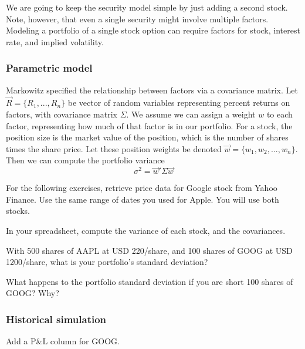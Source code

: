 \documentclass{report}
\numberwithin{problem}{chapter} %
\let\oldroblem\problem
\renewcommand{\problem}{ \oldroblem  \normalfont}
\newcommand{\pnl}{P\&L }
\begin{document}
We are going to keep the security model simple by just adding a second stock. Note, however, that even a single security might involve multiple factors. Modeling a portfolio of a single stock option can require factors for stock, interest rate, and implied volatility. 

\subsubsection{Parametric model}
Markowitz specified the relationship between factors via a covariance matrix. Let $\vec{R}=\{R_1, ...,R_n\}$ be vector of random variables representing percent returns on factors, with covariance matrix $\Sigma$. We assume we can assign a weight $w$ to each factor, representing how much of that factor is in our portfolio. For a stock, the position size is the market value of the position, which is the number of shares times the share price. Let these position weights be denoted $\vec{w} = \{ w_1, w_2, ..., w_n\}$. Then we can compute the portfolio variance 
\begin{equation}
\sigma^2 = \vec{w}' \Sigma \vec{w}
\end{equation}

For the following exercises, retrieve price data for Google stock from Yahoo Finance. Use the same range of dates you used for Apple. You will use both stocks. 

\problem In your spreadsheet, compute the variance of each stock, and the covariances.

\problem With 500 shares of AAPL at USD 220/share, and 100 shares of GOOG at USD 1200/share, what is your portfolio's standard deviation?

\problem What happens to the portfolio standard deviation if you are short 100 shares of GOOG? Why?

\subsubsection{Historical simulation}

\problem Add a \pnl column for GOOG. 

\printglossaries
\end{document}
